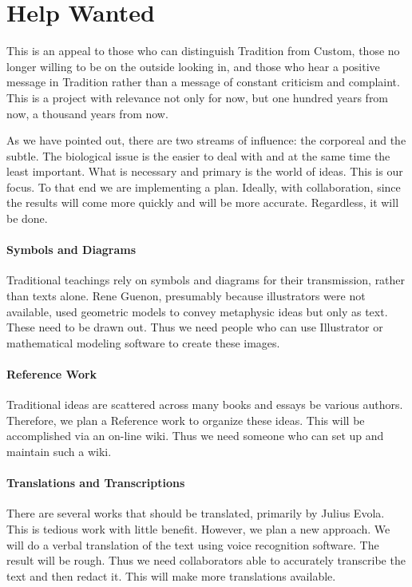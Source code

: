 \section{Help Wanted}

This is an appeal to those who can distinguish Tradition from Custom, those no longer willing to be on the outside looking in, and those who hear a positive message in Tradition rather than a message of constant criticism and complaint. This is a project with relevance not only for now, but one hundred years from now, a thousand years from now.

As we have pointed out, there are two streams of influence: the corporeal and the subtle. The biological issue is the easier to deal with and at the same time the least important. What is necessary and primary is the world of ideas. This is our focus. To that end we are implementing a plan. Ideally, with collaboration, since the results will come more quickly and will be more accurate. Regardless, it will be done.

\paragraph{Symbols and Diagrams}


Traditional teachings rely on symbols and diagrams for their transmission, rather than texts alone. Rene Guenon, presumably because illustrators were not available, used geometric models to convey metaphysic ideas but only as text. These need to be drawn out. Thus we need people who can use Illustrator or mathematical modeling software to create these images.

\paragraph{Reference Work}


Traditional ideas are scattered across many books and essays be various authors. Therefore, we plan a Reference work to organize these ideas. This will be accomplished via an on-line wiki. Thus we need someone who can set up and maintain such a wiki.

\paragraph{Translations and Transcriptions}


There are several works that should be translated, primarily by Julius Evola. This is tedious work with little benefit. However, we plan a new approach. We will do a verbal translation of the text using voice recognition software. The result will be rough. Thus we need collaborators able to accurately transcribe the text and then redact it. This will make more translations available.


